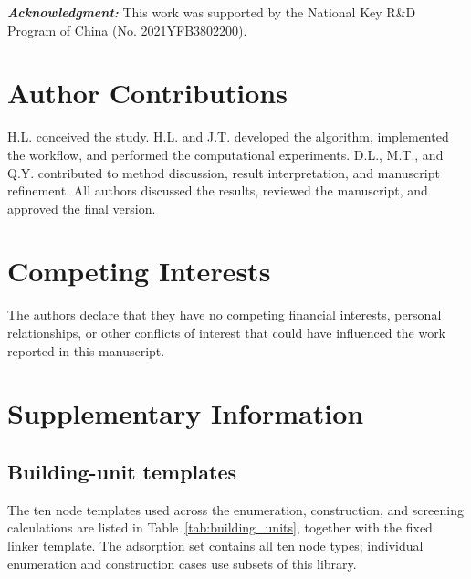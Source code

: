 \documentclass[a5paper, 10pt]{article}
\newcommand{\acknowledgment}[1]{\vspace{5mm}\singlespacing
  {\noindent\textbf{\textit{Acknowledgment\/:}} #1}
}
\begin{document}
\acknowledgment{This work was supported by the National Key R\&D Program of China (No. 2021YFB3802200).}

\section*{Author Contributions}
H.L. conceived the study. H.L. and J.T. developed the algorithm, implemented the workflow, and performed the computational experiments. D.L., M.T., and Q.Y. contributed to method discussion, result interpretation, and manuscript refinement. All authors discussed the results, reviewed the manuscript, and approved the final version.


\section*{Competing Interests}
The authors declare that they have no competing financial interests, personal relationships, or other conflicts of interest that could have influenced the work reported in this manuscript.



\singlespacing





\clearpage
\appendix
\section{Supplementary Information}
\label{app:supplementary}
\setcounter{equation}{0}
\renewcommand{\theequation}{A\arabic{equation}}
\renewcommand{\theHequation}{A.\arabic{equation}}
\setcounter{table}{0}
\renewcommand{\thetable}{A\arabic{table}}
\renewcommand{\theHtable}{A.\arabic{table}}
\setcounter{figure}{0}
\renewcommand{\thefigure}{A\arabic{figure}}
\renewcommand{\theHfigure}{A.\arabic{figure}}
\subsection{Building-unit templates}
\label{app:building_units}

The ten node templates used across the enumeration, construction, and screening calculations are listed in Table~\ref{tab:building_units}, together with the fixed linker template. The adsorption set contains all ten node types; individual enumeration and construction cases use subsets of this library.
\end{document}
